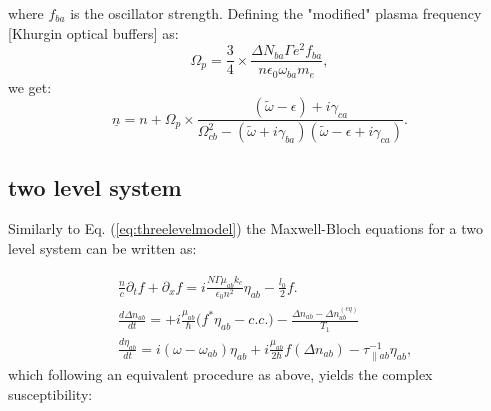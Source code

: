 \documentclass[10pt,letterpaper]{article}
\def\uline{\underline}
\begin{document}
	where $f_{ba}$ is the oscillator strength. Defining the "modified" plasma frequency [Khurgin optical buffers] as: 
	$$
	\Omega_p = \frac{3}{4}\times \frac{\Delta N_{ba}\Gamma e^2f_{ba}}{n\epsilon_0\omega_{ba}m_e}, 
	$$
	we get:
	$$
	\uline{n} = n+ \Omega_p \times \frac{(\tilde{\omega}-\epsilon)+i\gamma_{ca}}{\Omega_{cb}^2-(\tilde{\omega}+i\gamma_{ba})(\tilde{\omega}-\epsilon+i\gamma_{ca})}.
	$$ 
	
	\subsection{two level system}
	
	Similarly to Eq. (\ref{eq:threelevelmodel}) the Maxwell-Bloch equations for a two level system can be written as: 
	
	\begin{subequations}
		\label{eq:twolevelmodel}
		\begin{align}
		&\frac{n}{c}\partial_t f + \partial_{x}f = i\frac{N \Gamma \mu_{ab} k_c}{\epsilon_0 n^2} \eta_{ab} - \frac{l_0}{2} f \label{eq:rtwave} .\\
		&\frac{d \Delta n_{ab}}{d t} = + i\frac{\mu_{ab}}{\hbar} \big (f^*\eta_{ab}- c.c. \big )- \frac{\Delta n_{ab}-\Delta n_{ab}^{(eq)} }{T_{1}}  \\
		&\frac{d \eta_{ab}}{d t}   = i(\omega - \omega_{ab})\eta_{ab} +i \frac{\mu_{ab}}{2\hbar}f(\Delta n_{ab}) -  \tau_{\parallel ab}^{-1}\eta_{ab},
		\end{align}
	\end{subequations}
	which following an equivalent procedure as above, yields the complex susceptibility:
	
\end{document}
